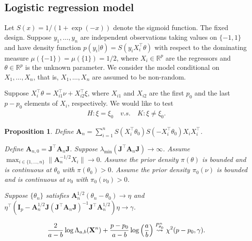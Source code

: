 \documentclass[11pt]{article}
\newcommand{\BA}{\mathbf{A}}    \newcommand{\BB}{\mathbf{B}}    \newcommand{\BC}{\mathbf{C}}    \newcommand{\BD}{\mathbf{D}}    \newcommand{\BE}{\mathbf{E}}    \newcommand{\BF}{\mathbf{F}}    \newcommand{\BG}{\mathbf{G}}    \newcommand{\BH}{\mathbf{H}}    \newcommand{\BI}{\mathbf{I}}    \newcommand{\BJ}{\mathbf{J}}    \newcommand{\BK}{\mathbf{K}}    \newcommand{\BL}{\mathbf{L}}
\newcommand{\myT}{\intercal}
\theoremstyle{plain}
\newtheorem{proposition}{\quad\quad Proposition}
\theoremstyle{definition}
\theoremstyle{remark}
\begin{document}

\subsection{Logistic regression model}\label{sec:logistic}

Let $S(x) = 1/(1+\exp(-x))$ denote the sigmoid function.
The fixed design.
Suppose $y_1, \dots, y_n$ are independent observations taking values on $\{-1,1\}$ and have density function
    $p(y_i | \theta) = S(y_i X_i^\myT \theta)$
    with respect to the dominating measure $\mu(\{-1\}) = \mu(\{1\}) = 1/2$, where $X_i \in \mathbb R^p$ are the regressors and $\theta \in \mathbb R^p$ is the unknown parameter.
    We consider the model conditional on $X_1,\dots,X_n$, that is, $X_1, \dots, X_n$ are assumed to be non-random.

    Suppose $X_i^\myT \theta = X_{i1}^\myT \nu + X_{i2}^\myT \xi$, where $X_{i1}$ and $X_{i2}$ are the first $p_0$ and the last $p-p_0$ elements of $X_i$, respectively.
    We would like to test 
\begin{align*}
    H:\xi= \xi_0 \quad v.s.\quad K: \xi\neq \xi_0. 
\end{align*}


\begin{proposition}
    \label{prop:logistic}
    Define $
 \BA_n = 
    \sum_{i=1}^n 
    S( X_i^\myT \theta_0)
    S(- X_i^\myT \theta_0)
    X_i
    X_i^\myT $.

    Define $
    \BA_{n, 0} = 
    \BJ^\myT \BA_n \BJ
    $.
Suppose $\lambda_{\min}(\BJ^\myT \BA_n \BJ) \to \infty$.
    Assume 
$
     \max_{i\in \{1,\dots,n\}}
 \|\BA_n^{-1/2}
 X_i\| \to 0.
$
Assume the prior density $\pi(\theta)$ is bounded and is continuous at $\theta_0$ with $\pi(\theta_0)> 0$.
Assume the prior density $\pi_0(\nu)$ is bounded and is continuous at $\nu_0$ with $\pi_0(\nu_0)> 0$.

Suppose $\{\theta_n\}$ satisfies $\BA_n^{1/2} (\theta_n - \theta_0) \to \eta$ and $
    \eta^\myT 
    (
        \BI_p-
    \BA_n^{1/2} \BJ ( \BJ^\myT \BA_n \BJ )^{-1} \BJ^\myT \BA_n^{1/2}  
)
\eta
\to \gamma
$.

\begin{align*}
    \frac{2}{a-b}\log \Lambda_{a, b} (\mathbf{X}^n)
    +
    \frac{p-p_0}{a-b} \log \left(\frac{a}{b}\right)
    \overset{P_{\theta_0}^n}{\rightsquigarrow}
    \chi^2 (p-p_0, \gamma)
.
\end{align*}
\end{proposition}
\end{document}

